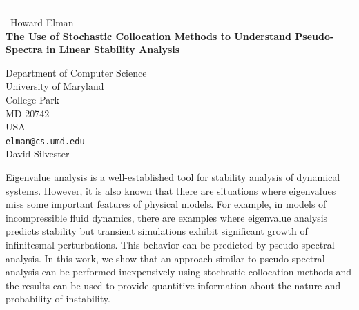 \documentclass{report}
\begin{document}
\begin{center}
\rule{6in}{1pt} \
{\large Howard Elman \\
{\bf The Use of Stochastic Collocation Methods to Understand Pseudo-Spectra in Linear Stability Analysis }}

Department of Computer Science \\ University of Maryland \\ College Park \\ MD 20742 \\ USA
\\
{\tt elman@cs.umd.edu}\\
David Silvester\end{center}

Eigenvalue analysis is a well-established tool for stability analysis of
dynamical systems. However, it is also known that there are situations
where eigenvalues miss some important features of physical models. For
example, in models of incompressible fluid dynamics, there are examples
where
eigenvalue analysis predicts stability but transient simulations exhibit
significant growth of infinitesmal perturbations. This behavior can be
predicted by pseudo-spectral analysis. In this work, we show that an
approach similar to pseudo-spectral analysis can be performed
inexpensively using stochastic collocation methods and the results can be
used to provide quantitive information about the nature and probability
of instability.
\end{document}
